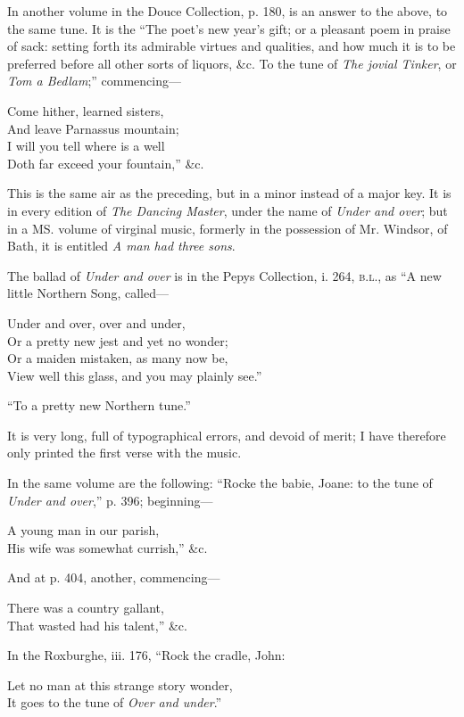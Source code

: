In another volume in the Douce Collection, p. 180, is an answer to the
above, to the same tune. It is the “The poet’s new year’s gift; or a pleasant
poem in praise of sack: setting forth its admirable virtues and qualities, and how
much it is to be preferred before all other sorts of liquors, \&c. To the tune of
\textit{The jovial Tinker}, or \textit{Tom a Bedlam};” commencing—
\settowidth{\versewidth}{\vin Doth far exceed your fountain,” \&c.}
\begin{scverse}\begin{altverse}
Come hither, learned sisters,\\
And leave Parnassus mountain;\\
I will you tell where is a well\\
Doth far exceed your fountain,” \&c.
\end{altverse}
\end{scverse}


This is the same air as the preceding, but in a minor instead of a major key.
It is in every edition of \textit{The Dancing Master}, under the name of \textit{Under and over};
but in a MS. volume of virginal music, formerly in the possession of Mr. Windsor,
of Bath, it is entitled \textit{A man had three sons}.

The ballad of \textit{Under and over} is in the Pepys Collection, i. 264, \textsc{b.l.}, as “A new
little Northern Song, called—
\settowidth{\versewidth}{Under and over, over and under,}
\begin{scverse}Under and over, over and under,\\
Or a pretty new jest and yet no wonder;\\
Or a maiden mistaken, as many now be,\\
View well this glass, and you may plainly see.”
\end{scverse}
“To a pretty new Northern tune.”

It is very long, full of typographical errors, and devoid of merit; I have
therefore only printed the first verse with the music.

In the same volume are the following: “Rocke the babie, Joane: to the tune
of \textit{Under and over},” p. 396; beginning—
\settowidth{\versewidth}{A young man in our parish,}
\begin{scverse}A young man in our parish,\\
His wife was somewhat currish,” \&c.
\end{scverse}
And at p. 404, another, commencing—
\begin{scverse}There was a country gallant,\\
That wasted had his talent,” \&c.
\end{scverse}
In the Roxburghe, iii. 176, “Rock the cradle, John:
\settowidth{\versewidth}{Let no man at this strange story wonder,}
\begin{scverse}Let no man at this strange story wonder,\\
It goes to the tune of \textit{Over and under}.”
\end{scverse}

